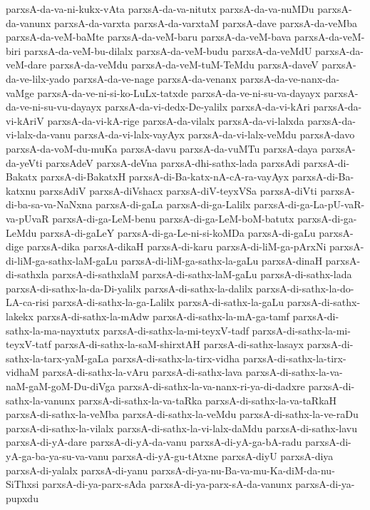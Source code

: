 {parxsA-da-va-ni-kukx-vAta
parxsA-da-va-nitutx
parxsA-da-va-nuMDu
parxsA-da-vanunx
parxsA-da-varxta
parxsA-da-varxtaM
parxsA-dave
parxsA-da-veMba
parxsA-da-veM-baMte
parxsA-da-veM-baru
parxsA-da-veM-bava
parxsA-da-veM-biri
parxsA-da-veM-bu-dilalx
parxsA-da-veM-budu
parxsA-da-veMdU
parxsA-da-veM-dare
parxsA-da-veMdu
parxsA-da-veM-tuM-TeMdu
parxsA-daveV
parxsA-da-ve-lilx-yado
parxsA-da-ve-nage
parxsA-da-venanx
parxsA-da-ve-nanx-da-vaMge
parxsA-da-ve-ni-si-ko-LuLx-tatxde
parxsA-da-ve-ni-su-va-dayayx
parxsA-da-ve-ni-su-vu-dayayx
parxsA-da-vi-dedx-De-yalilx
parxsA-da-vi-kAri
parxsA-da-vi-kAriV
parxsA-da-vi-kA-rige
parxsA-da-vilalx
parxsA-da-vi-lalxda
parxsA-da-vi-lalx-da-vanu
parxsA-da-vi-lalx-vayAyx
parxsA-da-vi-lalx-veMdu
parxsA-davo
parxsA-da-voM-du-muKa
parxsA-davu
parxsA-da-vuMTu
parxsA-daya
parxsA-da-yeVti
parxsAdeV
parxsA-deVna
parxsA-dhi-sathx-lada
parxsAdi
parxsA-di-Bakatx
parxsA-di-BakatxH
parxsA-di-Ba-katx-nA-cA-ra-vayAyx
parxsA-di-Ba-katxnu
parxsAdiV
parxsA-diVshacx
parxsA-diV-teyxVSa
parxsA-diVti
parxsA-di-ba-sa-va-NaNxna
parxsA-di-gaLa
parxsA-di-ga-Lalilx
parxsA-di-ga-La-pU-vaR-va-pUvaR
parxsA-di-ga-LeM-benu
parxsA-di-ga-LeM-boM-batutx
parxsA-di-ga-LeMdu
parxsA-di-gaLeY
parxsA-di-ga-Le-ni-si-koMDa
parxsA-di-gaLu
parxsA-dige
parxsA-dika
parxsA-dikaH
parxsA-di-karu
parxsA-di-liM-ga-pArxNi
parxsA-di-liM-ga-sathx-laM-gaLu
parxsA-di-liM-ga-sathx-la-gaLu
parxsA-dinaH
parxsA-di-sathxla
parxsA-di-sathxlaM
parxsA-di-sathx-laM-gaLu
parxsA-di-sathx-lada
parxsA-di-sathx-la-da-Di-yalilx
parxsA-di-sathx-la-dalilx
parxsA-di-sathx-la-do-LA-ca-risi
parxsA-di-sathx-la-ga-Lalilx
parxsA-di-sathx-la-gaLu
parxsA-di-sathx-lakekx
parxsA-di-sathx-la-mAdw
parxsA-di-sathx-la-mA-ga-tamf
parxsA-di-sathx-la-ma-nayxtutx
parxsA-di-sathx-la-mi-teyxV-tadf
parxsA-di-sathx-la-mi-teyxV-tatf
parxsA-di-sathx-la-saM-shirxtAH
parxsA-di-sathx-lasayx
parxsA-di-sathx-la-tarx-yaM-gaLa
parxsA-di-sathx-la-tirx-vidha
parxsA-di-sathx-la-tirx-vidhaM
parxsA-di-sathx-la-vAru
parxsA-di-sathx-lava
parxsA-di-sathx-la-va-naM-gaM-goM-Du-diVga
parxsA-di-sathx-la-va-nanx-ri-ya-di-dadxre
parxsA-di-sathx-la-vanunx
parxsA-di-sathx-la-va-taRka
parxsA-di-sathx-la-va-taRkaH
parxsA-di-sathx-la-veMba
parxsA-di-sathx-la-veMdu
parxsA-di-sathx-la-ve-raDu
parxsA-di-sathx-la-vilalx
parxsA-di-sathx-la-vi-lalx-daMdu
parxsA-di-sathx-lavu
parxsA-di-yA-dare
parxsA-di-yA-da-vanu
parxsA-di-yA-ga-bA-radu
parxsA-di-yA-ga-ba-ya-su-va-vanu
parxsA-di-yA-gu-tAtxne
parxsA-diyU
parxsA-diya
parxsA-di-yalalx
parxsA-di-yanu
parxsA-di-ya-nu-Ba-va-mu-Ka-diM-da-nu-SiThxsi
parxsA-di-ya-parx-sAda
parxsA-di-ya-parx-sA-da-vanunx
parxsA-di-ya-pupxdu
}
